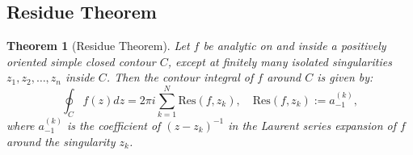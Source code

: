 \documentclass{article}
\newtheorem{theorem}{Theorem}[section]
\begin{document}
\subsection{Residue Theorem}

\begin{theorem}[Residue Theorem]
    Let $f$ be analytic on and inside a positively oriented simple closed contour $C$, except at finitely many isolated singularities $z_1, z_2, \ldots, z_n$ inside $C$. Then the contour integral of $f$ around $C$ is given by:
    \begin{equation}
        \oint_C f(z) dz = 2\pi i \sum_{k=1}^N \text{Res}(f,z_k), \quad \text{Res}(f,z_k) := a^{(k)}_{-1},
    \end{equation}
    where $a^{(k)}_{-1}$ is the coefficient of $(z-z_k)^{-1}$ in the Laurent series expansion of $f$ around the singularity $z_k$.
\end{theorem}
\end{document}
